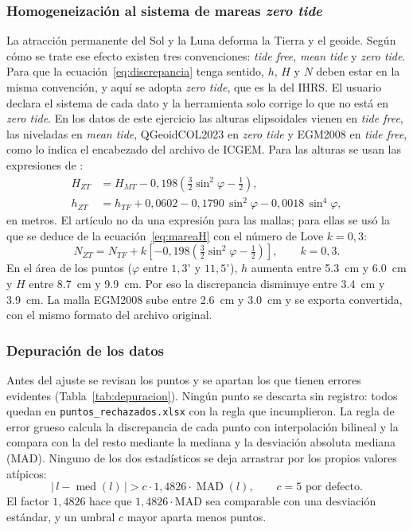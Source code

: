 \documentclass[11pt,letterpaper]{article}
\begin{document}
\subsubsection{Homogeneización al sistema de mareas \emph{zero tide}}
La atracción permanente del Sol y la Luna deforma la Tierra y el geoide. Según cómo se trate
ese efecto existen tres convenciones: \emph{tide free}, \emph{mean tide} y \emph{zero tide}. Para
que la ecuación~\eqref{eq:discrepancia} tenga sentido, $h$, $H$ y $N$ deben estar en la misma
convención, y aquí se adopta \emph{zero tide}, que es la del IHRS. El usuario declara el sistema
de cada dato y la herramienta solo corrige lo que no está en \emph{zero tide}. En los datos de
este ejercicio las alturas elipsoidales vienen en \emph{tide free}, las niveladas en \emph{mean
tide}, QGeoidCOL2023 en \emph{zero tide} y EGM2008 en \emph{tide free}, como lo indica el
encabezado del archivo de ICGEM. Para las alturas se usan las expresiones de \citet{guimaraes2025}:
\begin{align}
H_{ZT} &= H_{MT} - 0{,}198\left(\tfrac{3}{2}\sin^2\varphi-\tfrac{1}{2}\right), \label{eq:mareaH}\\
h_{ZT} &= h_{TF} + 0{,}0602 - 0{,}1790\,\sin^2\varphi - 0{,}0018\,\sin^4\varphi, \label{eq:mareah}
\end{align}
en metros. El artículo no da una expresión para las mallas; para ellas se usó la que se
deduce de la ecuación~\eqref{eq:mareaH} con el número de Love $k=0{,}3$:
\begin{equation}
N_{ZT} = N_{TF} + k\left[-0{,}198\left(\tfrac{3}{2}\sin^2\varphi-\tfrac{1}{2}\right)\right],
\qquad k=0{,}3 .
\label{eq:mareaN}
\end{equation}
En el área de los puntos ($\varphi$ entre $1{,}3^\circ$ y $11{,}5^\circ$), $h$ aumenta entre
\SI{5.3}{cm} y \SI{6.0}{cm} y $H$ entre \SI{8.7}{cm} y \SI{9.9}{cm}. Por eso la discrepancia
disminuye entre \SI{3.4}{cm} y \SI{3.9}{cm}. La malla EGM2008 sube entre \SI{2.6}{cm} y \SI{3.0}{cm} y
se exporta convertida, con el mismo formato del archivo original.

\subsubsection{Depuración de los datos}
Antes del ajuste se revisan los puntos y se apartan los que tienen errores evidentes
(Tabla~\ref{tab:depuracion}). Ningún punto se descarta sin registro: todos quedan en
\texttt{puntos\_rechazados.xlsx} con la regla que incumplieron. La regla de error grueso
calcula la discrepancia de cada punto con interpolación bilineal y la compara con la del
resto mediante la mediana y la desviación absoluta mediana (MAD). Ninguno de los dos
estadísticos se deja arrastrar por los propios valores atípicos:
\begin{equation}
\left|\,l - \operatorname{med}(l)\,\right| > c\cdot 1{,}4826\cdot\operatorname{MAD}(l),
\qquad c=5 \text{ por defecto}.
\label{eq:grueso}
\end{equation}
El factor $1{,}4826$ hace que $1{,}4826\cdot\mathrm{MAD}$ sea comparable con una desviación
estándar, y un umbral $c$ mayor aparta menos puntos.
\end{document}
